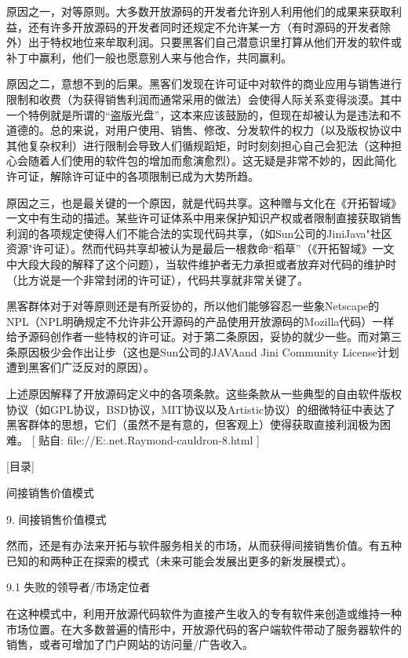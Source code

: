 \documentclass[a4paper,12pt,UTF8,twoside]{ctexbook}
\begin{document}
原因之一，对等原则。大多数开放源码的开发者允许别人利用他们的成果来获取利益，还有许多开放源码的开发者同时还规定不允许某一方（有时源码的开发者除外）出于特权地位来牟取利润。只要黑客们自己潜意识里打算从他们开发的软件或补丁中赢利，他们一般也愿意别人来与他合作，共同赢利。


原因之二，意想不到的后果。黑客们发现在许可证中对软件的商业应用与销售进行限制和收费（为获得销售利润而通常采用的做法）会使得人际关系变得淡漠。其中一个特例就是所谓的“盗版光盘”，这本来应该鼓励的，但现在却被认为是违法和不道德的。总的来说，对用户使用、销售、修改、分发软件的权力（以及版权协议中其他复杂权利）进行限制会导致人们循规蹈矩，时时刻刻担心自己会犯法（这种担心会随着人们使用的软件包的增加而愈演愈烈）。这无疑是非常不妙的，因此简化许可证，解除许可证中的各项限制已成为大势所趋。


原因之三，也是最关键的一个原因，就是代码共享。这种赠与文化在《开拓智域》一文中有生动的描述。某些许可证体系中用来保护知识产权或者限制直接获取销售利润的各项规定使得人们不能合法的实现代码共享，（如Sun公司的JiniJava"社区资源"许可证）。然而代码共享却被认为是最后一根救命“稻草”（《开拓智域》一文中大段大段的解释了这个问题），当软件维护者无力承担或者放弃对代码的维护时（比方说是一个非常封闭的许可证），代码共享就非常关键了。


黑客群体对于对等原则还是有所妥协的，所以他们能够容忍一些象Netscape的NPL（NPL明确规定不允许非公开源码的产品使用开放源码的Mozilla代码）一样给予源码创作者一些特权的许可证。对于第二条原因，妥协的就少一些。而对第三条原因极少会作出让步（这也是Sun公司的JAVAand Jini Community License计划遭到黑客们广泛反对的原因）。


上述原因解释了开放源码定义中的各项条款。这些条款从一些典型的自由软件版权协议（如GPL协议，BSD协议，MIT协议以及Artistic协议）的细微特征中表达了黑客群体的思想，它们（虽然不是有意的，但客观上）使得获取直接利润极为困难。
[ 贴自: file://E:\joyfire\joyfire.net\bible\Eric.Raymond\magic-cauldron-8.html ]

[目录]

间接销售价值模式

9. 间接销售价值模式

然而，还是有办法来开拓与软件服务相关的市场，从而获得间接销售价值。有五种已知的和两种正在探索的模式（未来可能会发展出更多的新发展模式）。


9.1 失败的领导者/市场定位者


在这种模式中，利用开放源代码软件为直接产生收入的专有软件来创造或维持一种市场位置。在大多数普遍的情形中，开放源代码的客户端软件带动了服务器软件的销售，或者可增加了门户网站的访问量/广告收入。
\end{document}
